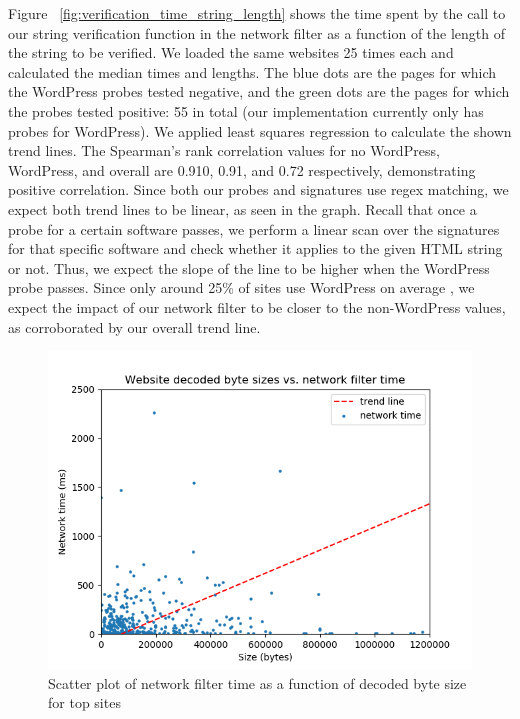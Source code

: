  Figure ~\ref{fig:verification_time_string_length} shows the time spent by the call to our string verification function in the network filter as a function of the length of the string to be verified. We loaded the same websites 25 times each and calculated the median times and lengths.  The blue dots are the pages for which the WordPress probes tested negative, and the green dots are the pages for which the probes tested positive: 55 in total (our implementation currently only has probes for WordPress). We applied least squares regression to calculate the shown trend lines. The Spearman's rank correlation values for no WordPress, WordPress, and overall are 0.910, 0.91, and 0.72 respectively, demonstrating positive correlation. Since both our probes and signatures use regex matching, we expect both trend lines to be linear, as seen in the graph. Recall that once a probe for a certain software passes, we perform a linear scan over the signatures for that specific software and check whether it applies to the given HTML string or not. Thus, we expect the slope of the line to be higher when the WordPress probe passes. Since only around 25\% of sites use WordPress on average \cite{w3techs}, we expect the impact of our network filter to be closer to the non-WordPress values, as corroborated by our overall trend line.

\begin{figure}[h]
	\includegraphics[scale=0.5]{results/byte_size_vs_filter_time.png}
	\caption{Scatter plot of network filter time as a function of decoded byte size for top sites}
	\label{fig:network_filter_decoded_size}
\end{figure}

